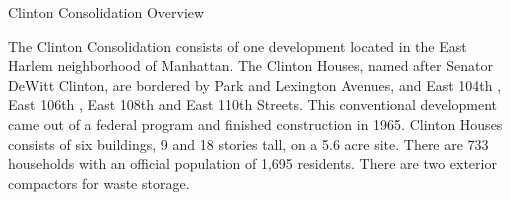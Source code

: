 Clinton Consolidation Overview

The Clinton Consolidation consists of one development located in the East Harlem neighborhood of Manhattan. The Clinton Houses, named after Senator DeWitt Clinton, are bordered by Park and Lexington Avenues, and East 104th , East 106th , East 108th  and East 110th Streets. This conventional development came out of a federal program and finished construction in 1965. Clinton Houses consists of six buildings, 9 and 18 stories tall, on a 5.6 acre site. There are 733 households with an official population of 1,695 residents. There are two exterior compactors for waste storage. 